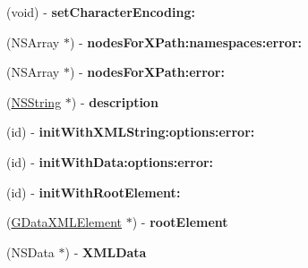 \begin{DoxyCompactItemize}
\item 
\hypertarget{interface_g_data_x_m_l_document_a4c38b4821cf2fd94e0be91e5f58c47c5}{
(void) -\/ {\bfseries setCharacterEncoding:}}
\label{interface_g_data_x_m_l_document_a4c38b4821cf2fd94e0be91e5f58c47c5}

\item 
\hypertarget{interface_g_data_x_m_l_document_a8f72a4eb0c1d63deb9cf99ec44459cc4}{
(NSArray $\ast$) -\/ {\bfseries nodesForXPath:namespaces:error:}}
\label{interface_g_data_x_m_l_document_a8f72a4eb0c1d63deb9cf99ec44459cc4}

\item 
\hypertarget{interface_g_data_x_m_l_document_aa354334c070410bde942b706ce83e190}{
(NSArray $\ast$) -\/ {\bfseries nodesForXPath:error:}}
\label{interface_g_data_x_m_l_document_aa354334c070410bde942b706ce83e190}

\item 
\hypertarget{interface_g_data_x_m_l_document_a9bc2a02ba6251d9670127923b43df1a9}{
(\hyperlink{class_n_s_string}{NSString} $\ast$) -\/ {\bfseries description}}
\label{interface_g_data_x_m_l_document_a9bc2a02ba6251d9670127923b43df1a9}

\item 
\hypertarget{interface_g_data_x_m_l_document_affa6920d0dfcedcd5bc0e21e74af971d}{
(id) -\/ {\bfseries initWithXMLString:options:error:}}
\label{interface_g_data_x_m_l_document_affa6920d0dfcedcd5bc0e21e74af971d}

\item 
\hypertarget{interface_g_data_x_m_l_document_a5aac20d1849c77ca0904fdd50e65491a}{
(id) -\/ {\bfseries initWithData:options:error:}}
\label{interface_g_data_x_m_l_document_a5aac20d1849c77ca0904fdd50e65491a}

\item 
\hypertarget{interface_g_data_x_m_l_document_ab91990967e0e050dfe889f9b67b0d4db}{
(id) -\/ {\bfseries initWithRootElement:}}
\label{interface_g_data_x_m_l_document_ab91990967e0e050dfe889f9b67b0d4db}

\item 
\hypertarget{interface_g_data_x_m_l_document_af6e96fd6b07f84044facaf26706f6497}{
(\hyperlink{interface_g_data_x_m_l_element}{GDataXMLElement} $\ast$) -\/ {\bfseries rootElement}}
\label{interface_g_data_x_m_l_document_af6e96fd6b07f84044facaf26706f6497}

\item 
\hypertarget{interface_g_data_x_m_l_document_a984d2f49915376794041612b8c7b0534}{
(NSData $\ast$) -\/ {\bfseries XMLData}}
\label{interface_g_data_x_m_l_document_a984d2f49915376794041612b8c7b0534}


\end{DoxyCompactItemize}
